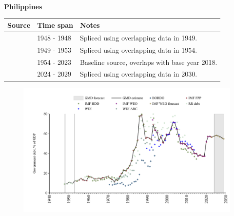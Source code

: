 \documentclass[12pt,a4paper,landscape]{article}
\begin{document}
\begin{adjustbox}{max totalsize={\paperwidth}{\paperheight},center}
\begin{minipage}[t][\textheight][t]{\textwidth}
\vspace*{0.5cm}
{}
\begin{center}
{\Large\bfseries Philippines}
\end{center}
\vspace{0.5cm}
\begin{table}[H]
\centering
\small
\begin{tabular}{|l|l|l|}
\hline
\textbf{Source} & \textbf{Time span} & \textbf{Notes} \\
\hline
\rowcolor{white}\cite{IMF_HDD}& 1948 - 1948 &Spliced using overlapping data in 1949.\\
\rowcolor{lightgray}\cite{RR_debt}& 1949 - 1953 &Spliced using overlapping data in 1954.\\
\rowcolor{white}\cite{IMF_FPP}& 1954 - 2023 &Baseline source, overlaps with base year 2018.\\
\rowcolor{lightgray}\cite{IMF_WEO_forecast}& 2024 - 2029 &Spliced using overlapping data in 2030.\\
\hline
\end{tabular}
\end{table}
\begin{figure}[H]
\centering
\includegraphics[width=\textwidth,height=0.6\textheight,keepaspectratio]{graphs/PHL_govdebt_GDP.pdf}
\end{figure}
\end{minipage}
\end{adjustbox}
\end{document}

